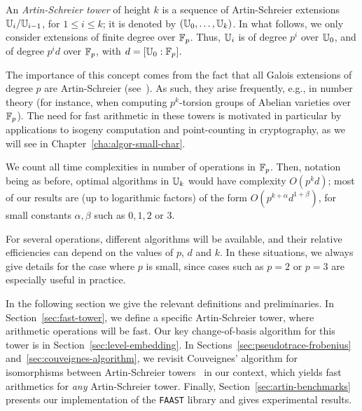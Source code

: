 An
\emph{Artin-Schreier
  tower} of height $k$ is a sequence of Artin-Schreier extensions
$\mathbb{U}_i / \mathbb{U}_{i-1}$, for $1\le i \le k$; it is denoted by $(\mathbb{U}_0,
\ldots, \mathbb{U}_k)$. In what follows, we only consider extensions of finite
degree over $\mathbb{F}_p$. Thus, $\mathbb{U}_i$ is of degree $p^i$ over $\mathbb{U}_0$, and
of degree $p^id$ over $\mathbb{F}_p$, with $d=[\mathbb{U}_0:\mathbb{F}_p]$.

The importance of this concept comes from the fact that all Galois
extensions of degree $p$ are Artin-Schreier (see~\cite[VI,
$\S6$]{lang}). As such, they arise frequently, e.g., in number theory
(for instance, when computing $p^k$-torsion groups of Abelian
varieties over $\mathbb{F}_p$). The need for fast arithmetic in these towers
is motivated in particular by applications to isogeny computation and
point-counting in cryptography, as we will see in
Chapter~\ref{cha:algor-small-char}.

We count all time complexities in number of operations in
$\mathbb{F}_p$. Then, notation being as before, optimal algorithms in $\mathbb{U}_k$
would have complexity $O(p^kd)$; most of our results are (up to
logarithmic factors) of the form $O(p^{k+\alpha} d^{1+\beta})$, for
small constants $\alpha,\beta$ such as $0,1,2$ or $3$.

For several operations, different algorithms will be available, and
their relative efficiencies can depend on the values of $p$, $d$ and
$k$. In these situations, we always give details for the case where
$p$ is small, since cases such as $p=2$ or $p=3$ are especially useful
in practice.

In the following section we give the relevant definitions and
preliminaries. In Section~\ref{sec:fast-tower}, we define a specific
Artin-Schreier tower, where arithmetic operations will be fast. Our
key change-of-basis algorithm for this tower is in
Section~\ref{sec:level-embedding}. In
Sections~\ref{sec:pseudotrace-frobenius}
and~\ref{sec:couveignes-algorithm}, we revisit Couveignes' algorithm
for isomorphisms between Artin-Schreier towers~\cite{couveignes00} in
our context, which yields fast arithmetics for \emph{any}
Artin-Schreier tower. Finally, Section~\ref{sec:artin-benchmarks}
presents our implementation of the \texttt{FAAST} library and gives
experimental results.



%
